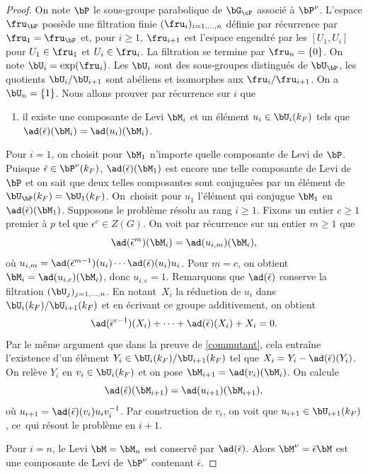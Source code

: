 \begin{proof}
On note $\bP$ le sous-groupe parabolique de $\bG_{\cF}$ associé à $\bP^{\nu}$. L'espace $\boldsymbol{\fru}_{\bP}$ possède une filtration finie $(\boldsymbol{\fru}_{i})_{i=1,\dots,n}$ définie par récurrence par $\boldsymbol{\fru}_{1}=\boldsymbol{\fru}_{\bP}$ et, pour $i\geq1$, $\boldsymbol{\fru}_{i+1}$ est l'espace engendré par les $[U_{1},U_{i}]$ pour $U_{1}\in \boldsymbol{\fru}_{1}$ et $U_{i}\in \boldsymbol{\fru}_{i}$. La filtration se termine par $\boldsymbol{\fru}_{n}=\{0\}$. On note $\bU_{i}=\exp(\boldsymbol{\fru}_{i})$. Les $\bU_{i}$ sont des sous-groupes distingués de $\bU_{\bP}$, les quotients $\bU_{i}/\bU_{i+1}$ sont abéliens et isomorphes aux $\boldsymbol{\fru}_{i}/\boldsymbol{\fru}_{i+1}$. On a $\bU_{n}=\{1\}$. Nous allons prouver par récurrence sur $i$ que
\begin{enumerate}
\item\label{p'unlemme1}
il existe une composante de Levi $\bM_{i}$ et un élément $u_{i}\in \bU_{i}(k_{F})$ tels que $\ad(\bar{\epsilon})(\bM_{i})=\ad(u_{i})(\bM_{i})$.
\end{enumerate}

Pour $i=1$, on choisit pour $\bM_{1}$ n'importe quelle composante de Levi de $\bP$. Puisque $\bar{\epsilon}\in \bP^{\nu}(k_{F})$, $\ad(\bar{\epsilon})(\bM_{1})$ est encore une telle composante de Levi de $\bP$ et on sait que deux telles composantes sont conjuguées par un élément de $\bU_{\bP}(k_{F})=\bU_{1}(k_{F})$. On~choisit pour $u_{1}$ l'élément qui conjugue $\bM_{1}$ en $\ad(\bar{\epsilon})(\bM_{1})$. Supposons le problème résolu au rang $i\geq1$.
Fixons un entier $c\geq1$ premier à $p$ tel que $\epsilon^c\in Z(G)$. On voit par récurrence sur un entier $m\geq1$ que
\[
\ad(\bar{\epsilon}^m)(\bM_{i})=\ad( u_{i,m})(\bM_{i}),
\]
où $u_{i,m}=\ad(\bar{\epsilon}^{m-1})(u_{i})\cdots\ad(\bar{\epsilon})(u_{i})u_{i}$. Pour $m=c$, on obtient $\bM_{i}=\ad(u_{i,c})(\bM_{i})$, donc $u_{i,c}=1$. Remarquons que $\ad(\bar{\epsilon})$ conserve la filtration $(\bU_{j})_{j=1,\dots,n}$. En notant~$X_{i}$ la réduction de $u_{i}$ dans $\bU_{i}(k_{F})/\bU_{i+1}(k_{F})$ et en écrivant ce groupe additivement, on obtient
\[
\ad(\bar{\epsilon}^{c-1})(X_{i})+\cdots+\ad(\bar{\epsilon})(X_{i})+X_{i}=0.
\]
Par le même argument que dans la preuve de \ref{commutant}, cela entraîne l'existence d'un élément $Y_{i}\in \bU_{i}(k_{F})/\bU_{i+1}(k_{F})$ tel que $X_{i}=Y_{i}-\ad(\bar{\epsilon})(Y_{i})$. On relève $Y_{i}$ en $v_{i}\in \bU_{i}(k_{F})$ et on pose $\bM_{i+1}=\ad(v_{i})(\bM_{i})$. On calcule
\[
\ad(\bar{\epsilon})(\bM_{i+1})=\ad(u_{i+1})(\bM_{i+1}),
\]
où $u_{i+1}=\ad(\bar{\epsilon})(v_{i})u_{i}v_{i}^{-1}$. Par construction de $v_{i}$, on voit que $u_{i+1}\in \bU_{i+1}(k_{F})$, ce~qui résout le problème en $i+1$.

Pour $i=n$, le Levi $\bM=\bM_{n}$ est conservé par $\ad(\bar{\epsilon})$. Alors $\bM^{\nu}=\bar{\epsilon}\bM$ est une composante de Levi de $\bP^{\nu}$ contenant $\bar{\epsilon}$.
\end{proof}

